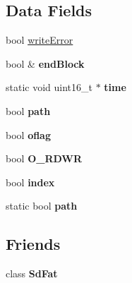 \subsection*{Data Fields}
\begin{DoxyCompactItemize}
\item 
bool \hyperlink{class_sd_base_file_a800e5043596b8bec0dd32076d3c9750c}{write\-Error}
\item 
\hypertarget{class_sd_base_file_a59ccb0407e4759a5363d4262e18aec73}{bool \& {\bfseries end\-Block}}\label{class_sd_base_file_a59ccb0407e4759a5363d4262e18aec73}

\item 
\hypertarget{class_sd_base_file_affcf6be1d8a276e78f7a669c22fee4e6}{static void uint16\-\_\-t $\ast$ {\bfseries time}}\label{class_sd_base_file_affcf6be1d8a276e78f7a669c22fee4e6}

\item 
\hypertarget{class_sd_base_file_a55cf894a3c789d80a963f10433251dfe}{bool {\bfseries path}}\label{class_sd_base_file_a55cf894a3c789d80a963f10433251dfe}

\item 
\hypertarget{class_sd_base_file_a2319f1b18c7dcb22957b3f75f6436299}{bool {\bfseries oflag}}\label{class_sd_base_file_a2319f1b18c7dcb22957b3f75f6436299}

\item 
\hypertarget{class_sd_base_file_a49c49194ba38e12c0991dfb65cf4876a}{bool {\bfseries O\-\_\-\-R\-D\-W\-R}}\label{class_sd_base_file_a49c49194ba38e12c0991dfb65cf4876a}

\item 
\hypertarget{class_sd_base_file_a7e1f783bbc6758254c17c5d46122e830}{bool {\bfseries index}}\label{class_sd_base_file_a7e1f783bbc6758254c17c5d46122e830}

\item 
\hypertarget{class_sd_base_file_a55cf894a3c789d80a963f10433251dfe}{static bool {\bfseries path}}\label{class_sd_base_file_a55cf894a3c789d80a963f10433251dfe}

\end{DoxyCompactItemize}
\subsection*{Friends}
\begin{DoxyCompactItemize}
\item 
\hypertarget{class_sd_base_file_ac838f1e6beb01ec57bd4b52e57df85e7}{class {\bfseries Sd\-Fat}}\label{class_sd_base_file_ac838f1e6beb01ec57bd4b52e57df85e7}

\end{DoxyCompactItemize}


